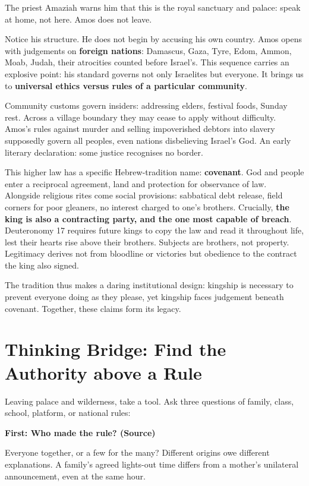 The priest Amaziah warns him that this is the royal sanctuary and palace: speak at home, not here. Amos does not leave.

Notice his structure. He does not begin by accusing his own country. Amos opens with judgements on \textbf{foreign nations}: Damascus, Gaza, Tyre, Edom, Ammon, Moab, Judah, their atrocities counted before Israel's. This sequence carries an explosive point: his standard governs not only Israelites but everyone. It brings us to \textbf{universal ethics versus rules of a particular community}.

Community customs govern insiders: addressing elders, festival foods, Sunday rest. Across a village boundary they may cease to apply without difficulty. Amos's rules against murder and selling impoverished debtors into slavery supposedly govern all peoples, even nations disbelieving Israel's God. An early literary declaration: some justice recognises no border.

This higher law has a specific Hebrew-tradition name: \textbf{covenant}. God and people enter a reciprocal agreement, land and protection for observance of law. Alongside religious rites come social provisions: sabbatical debt release, field corners for poor gleaners, no interest charged to one's brothers. Crucially, \textbf{the king is also a contracting party, and the one most capable of breach}. Deuteronomy 17 requires future kings to copy the law and read it throughout life, lest their hearts rise above their brothers. Subjects are brothers, not property. Legitimacy derives not from bloodline or victories but obedience to the contract the king also signed.

The tradition thus makes a daring institutional design: kingship is necessary to prevent everyone doing as they please, yet kingship faces judgement beneath covenant. Together, these claims form its legacy.

\section[Thinking Bridge: A Rule's Higher Authority]{Thinking Bridge: Find the Authority above a Rule}
Leaving palace and wilderness, take a tool. Ask three questions of family, class, school, platform, or national rules:

\textbf{First: Who made the rule? (Source)}

Everyone together, or a few for the many? Different origins owe different explanations. A family's agreed lights-out time differs from a mother's unilateral announcement, even at the same hour.

